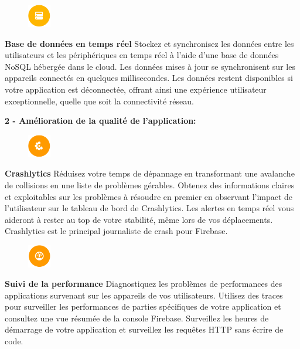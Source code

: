 \begin{figure}
	\includegraphics[width=1cm]{Images/chapter2/firebase_services/realtime_database.png}
\end{figure}
\textbf{Base de données en temps réel} Stockez et synchronisez les données entre les utilisateurs et les périphériques en temps réel à l'aide d'une base de données NoSQL hébergée dans le cloud. Les données mises à jour se synchronisent sur les appareils connectés en quelques millisecondes. Les données restent disponibles si votre application est déconnectée, offrant ainsi une expérience utilisateur exceptionnelle, quelle que soit la connectivité réseau.\bigskip

\longtab \textbf{2 - Amélioration de la qualité de l'application:}\bigskip

\begin{figure}
	\includegraphics[width=1cm]{Images/chapter2/firebase_services/crashlytics.png}
\end{figure}
\textbf{Crashlytics} Réduisez votre temps de dépannage en transformant une avalanche de collisions en une liste de problèmes gérables. Obtenez des informations claires et exploitables sur les problèmes à résoudre en premier en observant l'impact de l'utilisateur sur le tableau de bord de Crashlytics. Les alertes en temps réel vous aideront à rester au top de votre stabilité, même lors de vos déplacements. Crashlytics est le principal journaliste de crash pour Firebase.\medskip

\begin{figure}
	\includegraphics[width=1cm]{Images/chapter2/firebase_services/performance_monitoring.png}
\end{figure}
\textbf{Suivi de la performance} Diagnostiquez les problèmes de performances des applications survenant sur les appareils de vos utilisateurs. Utilisez des traces pour surveiller les performances de parties spécifiques de votre application et consultez une vue résumée de la console Firebase. Surveillez les heures de démarrage de votre application et surveillez les requêtes HTTP sans écrire de code.\medskip

